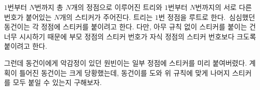 $1$번부터 $N$번까지 총 $N$개의 정점으로 이루어진 트리와 $1$번부터 $N$번까지의 서로 다른 번호가 붙어있는 $N$개의 스티커가 주어진다. 트리는 $1$번 정점을 루트로 한다. 심심했던 동건이는 각 정점에 스티커를 붙이려고 한다. 다만, 아무 규칙 없이 스티커를 붙이는 건 너무 시시하기 때문에 부모 정점의 스티커 번호가 자식 정점의 스티커 번호보다 크도록 붙이려고 한다. 

그런데 동건이에게 악감정이 있던 원빈이는 일부 정점에 스티커를 미리 붙여버렸다. 계획이 틀어진 동건이는 크게 당황했는데, 동건이를 도와 위 규칙에 맞게 나머지 스티커를 모두 붙일 수 있는지 구해보자.